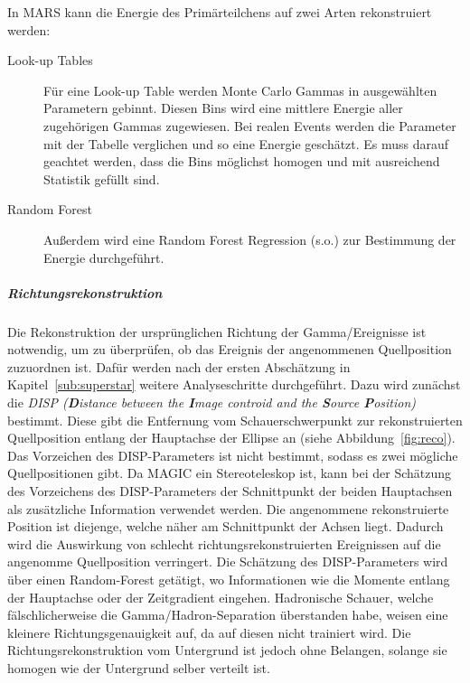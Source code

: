 In MARS kann die Energie des Primärteilchens auf zwei Arten rekonstruiert werden:
\begin{description}
	\item[\quad Look-up Tables] Für eine Look-up Table werden Monte Carlo
		Gammas in ausgewählten Parametern gebinnt.
		Diesen Bins wird eine mittlere Energie aller
		zugehörigen Gammas zugewiesen.
		Bei realen Events werden die Parameter mit der Tabelle verglichen
		und so eine Energie geschätzt.
		Es muss darauf geachtet werden,
		dass die Bins möglichst homogen und mit ausreichend Statistik gefüllt sind.
	\item[\quad Random Forest] Außerdem wird eine Random Forest Regression (s.o.)
		zur Bestimmung der Energie durchgeführt.
\end{description}

\subparagraph{Richtungsrekonstruktion}%
\label{par:position}

Die Rekonstruktion der ursprünglichen Richtung der Gamma\-/Ereignisse
ist notwendig, um zu überprüfen, ob das Ereignis der angenommenen
Quellposition zuzuordnen ist.
Dafür werden nach der ersten Abschätzung in Kapitel~\ref{sub:superstar} weitere
Analyseschritte durchgeführt.
Dazu wird zunächst die \textit{DISP (\textbf{D}istance between the
\textbf{I}mage controid and the \textbf{S}ource \textbf{P}osition)} bestimmt.
Diese gibt die Entfernung vom Schauerschwerpunkt zur rekonstruierten Quellposition
entlang der Hauptachse der Ellipse an (siehe Abbildung~\ref{fig:reco}).
Das Vorzeichen des DISP-Parameters ist nicht bestimmt,
sodass es zwei mögliche Quellpositionen gibt.
Da MAGIC ein Stereoteleskop ist,
kann bei der Schätzung des Vorzeichens des DISP-Parameters
der Schnittpunkt der beiden Hauptachsen als zusätzliche Information
verwendet werden.
Die angenommene rekonstruierte Position ist diejenge, welche näher am
Schnittpunkt der Achsen liegt.
Dadurch wird die Auswirkung von schlecht richtungsrekonstruierten Ereignissen
auf die angenomme Quellposition verringert.
Die Schätzung des DISP-Parameters wird über einen Random-Forest getätigt,
wo Informationen wie die Momente entlang der Hauptachse oder der Zeitgradient eingehen.
Hadronische Schauer, welche fälschlicherweise die Gamma/Hadron-Separation
überstanden habe, weisen eine kleinere Richtungsgenauigkeit auf, da auf diesen
nicht trainiert wird.
Die Richtungsrekonstruktion vom Untergrund ist jedoch ohne Belangen, solange sie
homogen wie der Untergrund selber verteilt ist.


